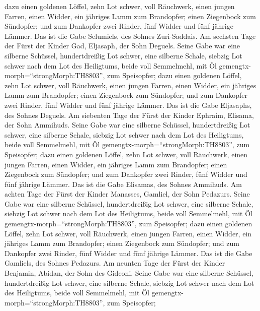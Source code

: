 dazu einen goldenen Löffel, zehn Lot schwer, voll Räuchwerk,
 einen jungen Farren, einen Widder, ein jähriges Lamm zum
Brandopfer;  einen Ziegenbock zum Sündopfer; 
und zum Dankopfer zwei Rinder, fünf Widder und fünf jährige Lämmer. Das
ist die Gabe Selumiels, des Sohnes Zuri-Saddais.  Am
sechsten Tage der Fürst der Kinder Gad, Eljasaph, der Sohn Deguels.
 Seine Gabe war eine silberne Schüssel, hundertdreißig Lot
schwer, eine silberne Schale, siebzig Lot schwer nach dem Lot des
Heiligtums, beide voll Semmelmehl, mit Öl
gemengtx-morph=``strongMorph:TH8803'', zum Speisopfer; 
dazu einen goldenen Löffel, zehn Lot schwer, voll Räuchwerk,
 einen jungen Farren, einen Widder, ein jähriges Lamm zum
Brandopfer;  einen Ziegenbock zum Sündopfer; 
und zum Dankopfer zwei Rinder, fünf Widder und fünf jährige Lämmer. Das
ist die Gabe Eljasaphs, des Sohnes Deguels.  Am siebenten
Tage der Fürst der Kinder Ephraim, Elisama, der Sohn Ammihuds.
 Seine Gabe war eine silberne Schüssel, hundertdreißig Lot
schwer, eine silberne Schale, siebzig Lot schwer nach dem Lot des
Heiligtums, beide voll Semmelmehl, mit Öl
gemengtx-morph=``strongMorph:TH8803'', zum Speisopfer; 
dazu einen goldenen Löffel, zehn Lot schwer, voll Räuchwerk,
 einen jungen Farren, einen Widder, ein jähriges Lamm zum
Brandopfer;  einen Ziegenbock zum Sündopfer; 
und zum Dankopfer zwei Rinder, fünf Widder und fünf jährige Lämmer. Das
ist die Gabe Elisamas, des Sohnes Ammihuds.  Am achten Tage
der Fürst der Kinder Manasses, Gamliel, der Sohn Pedazurs. 
Seine Gabe war eine silberne Schüssel, hundertdreißig Lot schwer, eine
silberne Schale, siebzig Lot schwer nach dem Lot des Heiligtums, beide
voll Semmelmehl, mit Öl gemengtx-morph=``strongMorph:TH8803'', zum
Speisopfer;  dazu einen goldenen Löffel, zehn Lot schwer,
voll Räuchwerk,  einen jungen Farren, einen Widder, ein
jähriges Lamm zum Brandopfer;  einen Ziegenbock zum
Sündopfer;  und zum Dankopfer zwei Rinder, fünf Widder und
fünf jährige Lämmer. Das ist die Gabe Gamliels, des Sohnes Pedazurs.
 Am neunten Tage der Fürst der Kinder Benjamin, Abidan, der
Sohn des Gideoni.  Seine Gabe war eine silberne Schüssel,
hundertdreißig Lot schwer, eine silberne Schale, siebzig Lot schwer nach
dem Lot des Heiligtums, beide voll Semmelmehl, mit Öl
gemengtx-morph=``strongMorph:TH8803'', zum Speisopfer; 
